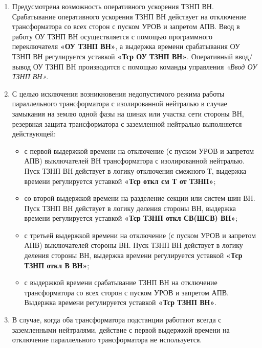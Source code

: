 \begin{enumerate}
\item
Предусмотрена возможность оперативного ускорения ТЗНП ВН. Срабатывание оперативного ускорения ТЗНП ВН действует на отключение трансформатора со всех сторон с пуском УРОВ и запретом АПВ. Ввод в работу ОУ ТЗНП ВН осуществляется с помощью программного переключателя \textbf{«ОУ ТЗНП ВН»}, а выдержка времени срабатывания ОУ ТЗНП ВН регулируется уставкой \textbf{«Тср ОУ ТЗНП ВН»}. Оперативный ввод/вывод ОУ ТЗНП ВН производится с помощью команды управления \textit{«Ввод ОУ ТЗНП ВН»}.

\item
С целью исключения возникновения недопустимого режима работы параллельного трансформатора с изолированной нейтралью в случае замыкания на землю одной фазы на шинах или участка сети стороны ВН, резервная защита трансформатора с заземленной нейтралью выполняется действующей:
\begin{itemize}
\item с первой выдержкой времени на отключение (с пуском УРОВ и запретом АПВ) выключателей ВН трансформатора с изолированной нейтралью. Пуск ТЗНП ВН действует в логику отключения смежного Т, выдержка времени регулируется уставкой \textbf{«Тср откл см Т от ТЗНП»};
\item со второй выдержкой времени на разделение секции или систем шин ВН. Пуск ТЗНП ВН действует в логику деления стороны ВН, выдержка времени регулируется уставкой \textbf{«Тср ТЗНП откл СВ(ШСВ) ВН»};
\item с третьей выдержкой времени на отключение (с пуском УРОВ и запретом АПВ) выключателей стороны ВН. Пуск ТЗНП ВН действует в логику деления стороны ВН, выдержка времени регулируется уставкой \textbf{«Тср ТЗНП откл В ВН»};
\item с выдержкой времени срабатывание ТЗНП ВН на отключение трансформатора со всех сторон с пуском УРОВ и запретом АПВ. Выдержка времени регулируется уставкой \textbf{«Тср ТЗНП ВН»}.
\end{itemize}

\item
В случае, когда оба трансформатора подстанции работают всегда с заземленными нейтралями, действие с первой выдержкой времени на отключение параллельного трансформатора не используется.













































\end{enumerate} 